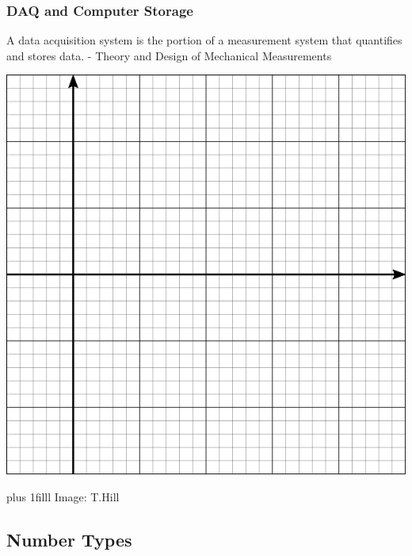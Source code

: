 \documentclass[fleqn]{beamer} %
\newcommand{\sectionIsubsectionItitle}{DAQ and Computer Storage}
\newcommand{\sectionIsubsectionIItitle}{Number Types}
\newcommand{\btVFill}{\vskip0pt plus 1filll}
\begin{document}
			\begin{frame}
				\frametitle{\sectionIsubsectionItitle}

				A data acquisition system is the portion of a measurement system that quantifies and stores data. - {\tiny Theory and Design of Mechanical Measurements}

				\begin{multicols}{2}
				\includegraphics[scale=.30]{images/cartesian_6x6_B.png} 
				

				\end{multicols}
				\btVFill
				\tiny{Image: T.Hill}
	
			\end{frame}


		\subsection{\sectionIsubsectionIItitle}\label{sectionIsubsectionII}
\end{document}
